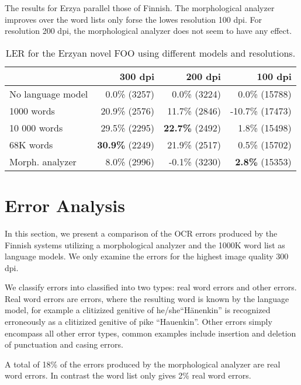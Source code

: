 \documentclass[b5paper]{article}
\begin{document}
The results for Erzya parallel those of Finnish. The morphological
analyzer improves over the word lists only forse the lowes resolution
100 dpi. For resolution 200 dpi, the morphological analyzer does not
seem to have any effect.

\begin{table}[!htb]
\begin{center}
\begin{tabular}{lrrr}
\hline 
                  & 300 dpi & 200 dpi & 100 dpi \\
\hline 
No language model &  0.0\% (3257)  &  0.0\% (3224)  &  0.0\% (15788)  \\
1000 words        &  20.9\% (2576)  &  11.7\% (2846)  & -10.7\%  (17473) \\
10 000 words      &  29.5\% (2295)  &   {\bf 22.7\%} (2492)  & 1.8\% (15498)  \\
68K words         &  {\bf 30.9\%} (2249)  &  21.9\% (2517)  & 0.5\% (15702)\\
Morph. analyzer   &  8.0\% (2996)  &  -0.1\% (3230)  & {\bf 2.8\%} (15353)  \\
\hline 
\end{tabular}
\caption{LER for the Erzyan novel FOO using different models and resolutions.}\label{myv-novel-res}
\end{center}
\end{table}

\section{Error Analysis}
\label{err}

In this section, we present a comparison of the OCR errors produced by
the Finnish systems utilizing a morphological analyzer and the 1000K
word list as language models. We only examine the errors for the
highest image quality 300 dpi.

We classify errors into classified into two types: real word errors
and other errors. Real word errors are errors, where the resulting
word is known by the language model, for example a clitizized genitive
of he/she``Hänenkin'' is recognized erroneously as a clitizized
genitive of pike ``Hauenkin''. Other errors simply encompass all other
error types, common examples include insertion and deletion of
punctuation and casing errors.

A total of 18\% of the errors produced by the morphological analyzer
are real word errors. In contrast the word list only gives 2\% real
word errors.
\end{document}
